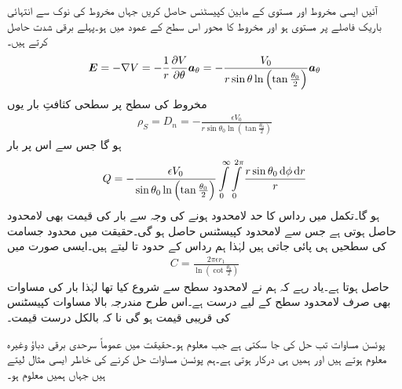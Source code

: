 آئیں ایسی مخروط اور مستوی کے مابین کپیسٹنس حاصل کریں جہاں مخروط کی نوک سے انتہائی باریک فاصلے پر مستوی ہو اور مخروط کا محور اس سطح کے عمود میں ہو۔پہلے برقی شدت حاصل کرتے ہیں۔
\begin{align}
{\ensuremath{{\boldsymbol{E}}}}=-\nabla V=-\frac{1}{r} \frac{\partial V}{\partial \theta} {\boldsymbol{a}}_{\theta}=-\frac{V_0}{r \sin \theta  \ln \left (\tan \frac{\theta_0}{2} \right)} {\boldsymbol{a}}_{\theta}
\end{align}
مخروط کی سطح پر سطحی کثافتِ بار یوں
\begin{align*}
\rho_S=D_n=-\frac{\epsilon V_0}{r \sin \theta_0  \ln \left (\tan \frac{\theta_0}{2} \right)}
\end{align*}
ہو گا جس سے اس پر بار
\begin{align*}
Q=-\frac{\epsilon V_0}{\sin \theta_0  \ln \left (\tan \frac{\theta_0}{2} \right)}\int \limits_0^\infty \int \limits_0^{2\pi}\frac{r \sin \theta_0 \dif \phi \dif r}{r}
\end{align*}
ہو گا۔تکمل میں رداس کا حد لامحدود ہونے کی وجہ سے بار کی قیمت بھی لامحدود حاصل ہوتی ہے جس سے لامحدود کپیسٹنس حاصل ہو گی۔حقیقت میں محدود جسامت کی سطحیں ہی پائی جاتی ہیں لہٰذا ہم رداس کے حدود  تا  لیتے ہیں۔ایسی صورت میں
\begin{align}\label{مساوات_لاپلاس_مخروطی_کپیسٹنس}
C=\frac{2\pi \epsilon r_1}{\ln \left(\cot \frac{\theta_0}{2} \right)}
\end{align}
حاصل ہوتا ہے۔یاد رہے کہ ہم نے لامحدود سطح سے شروع کیا تھا لہٰذا بار کی مساوات بھی صرف لامحدود سطح کے لیے درست ہے۔اس طرح مندرجہ بالا مساوات کپیسٹنس کی قریبی قیمت ہو گی نا کہ بالکل درست قیمت۔ 

پوئسن مساوات تب حل کی جا سکتی ہے جب  معلوم ہو۔حقیقت میں عموماً سرحدی برقی دباؤ وغیرہ معلوم ہوتے ہیں اور ہمیں  ہی درکار ہوتی ہے۔ہم پوئسن مساوات حل کرنے کی خاطر ایسی مثال لیتے ہیں جہاں ہمیں  معلوم ہو۔

